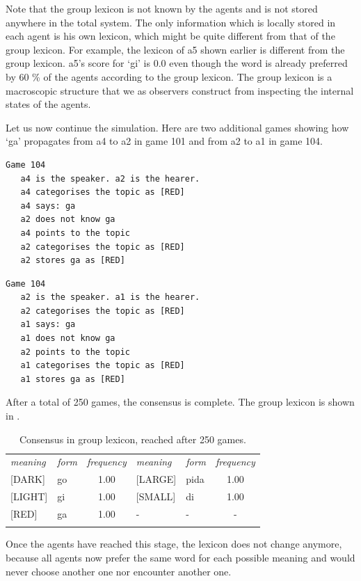 Note that the group lexicon is not known by the agents
and is not stored anywhere in the 
total system. The only information which is locally stored in each 
agent is his own lexicon, which might be quite different from that 
of the group lexicon. For example, the lexicon of {\bfshape a5} shown earlier
is different from the group lexicon.
{\bfshape a5}'s score for `gi' is 0.0
even though the word is already preferred by 60 \% of 
the agents according to the group lexicon. 
The group lexicon is a macroscopic structure that we
as observers construct from inspecting the internal 
states of the agents. 

Let us now continue the simulation. Here are two additional
games showing how `ga' propagates from {\bfshape a4} to {\bfshape a2} in 
game 101 and from {\bfshape a2} to {\bfshape a1} in game 104. 
\begin{verbatim}
Game 104
   a4 is the speaker. a2 is the hearer. 
   a4 categorises the topic as [RED]
   a4 says: ga
   a2 does not know ga
   a4 points to the topic
   a2 categorises the topic as [RED]
   a2 stores ga as [RED]
\end{verbatim}
\begin{verbatim}
Game 104
   a2 is the speaker. a1 is the hearer. 
   a2 categorises the topic as [RED]
   a1 says: ga
   a1 does not know ga
   a2 points to the topic
   a1 categorises the topic as [RED]
   a1 stores ga as [RED]
\end{verbatim}
After a total of 250 games, the consensus is complete. 
The group lexicon is shown in . 

\begin{table}
\begin{center}
\begin{tabular}{l  l  c  l  l  c } \midrule 
{\itshape meaning} & {\itshape form} & {\itshape frequency} & {\itshape meaning} & {\itshape form} & {\itshape frequency}\\  
{}[DARK]& go & 1.00 & [LARGE]& pida & 1.00 \\  
{}[LIGHT]& gi & 1.00 & [SMALL]& di & 1.00 \\  
{}[RED]& ga & 1.00 & - & - & -  \\  
\lspbottomrule
\end{tabular}
\caption{\label{tab:t-mem5}Consensus in group lexicon, reached after 250 games.}
\end{center}
\end{table}
Once the agents have reached this stage, the lexicon does not 
change anymore, because all agents now prefer the same word for 
each possible meaning and would never choose another one
nor encounter another one. 

